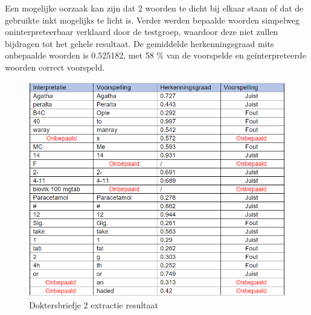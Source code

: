 Een mogelijke oorzaak kan zijn dat 2 woorden te dicht bij elkaar staan of dat de gebruikte inkt mogelijks te licht is. Verder werden bepaalde woorden simpelweg oninterpreteerbaar verklaard door de testgroep, waardoor deze niet zullen bijdragen tot het gehele resultaat. De gemiddelde herkenningsgraad mits onbepaalde woorden is 0.525182, met 58 \% van de voorspelde en geïnterpreteerde woorden correct voorspeld. 
\begin{figure}[h]
	
	\includegraphics[width=\textwidth,height=\textheight,keepaspectratio]{../Foto's/doktersbriefje2_tabel}
	\captionsetup{justification=centering,margin=2cm}
	\caption{Doktersbriefje 2 extractie resultaat}
	\centering
\end{figure}
\clearpage
